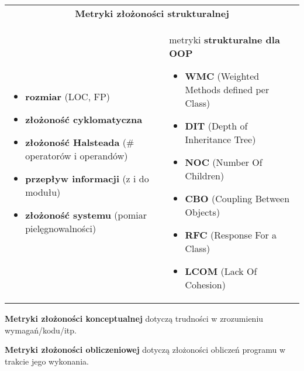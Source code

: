 \documentclass[../main.tex]{subfiles}
\begin{document}
    \begin{table}[H]
        \begin{center}
            \begin{tabular}{p{} p{8cm}}
                \multicolumn{2}{c}{  \textbf{Metryki złożoności strukturalnej}}\\
                \begin{itemize}
                    \item \textbf{rozmiar} (LOC, FP)
                    \item \textbf{złożoność cyklomatyczna}
                    \item \textbf{złożoność Halsteada} (\# operatorów i operandów)
                    \item \textbf{przepływ informacji} (z i do modułu)
                    \item \textbf{złożoność systemu} (pomiar pielęgnowalności)
                \end{itemize}
                &
                metryki \textbf{strukturalne dla OOP}
                \begin{itemize}
                    \item \textbf{WMC} (Weighted Methods defined per Class)
                    \item \textbf{DIT} (Depth of Inheritance Tree)
                    \item \textbf{NOC} (Number Of Children)
                    \item \textbf{CBO} (Coupling Between Objects)
                    \item \textbf{RFC} (Response For a Class)
                    \item \textbf{LCOM} (Lack Of Cohesion)
                \end{itemize}\\
            \end{tabular}
        \end{center}
    \end{table}

    \textbf{Metryki złożoności konceptualnej} dotyczą trudności w zrozumieniu wymagań/kodu/itp.

    \textbf{Metryki złożoności obliczeniowej} dotyczą złożoności obliczeń programu w trakcie jego wykonania.
\end{document}
